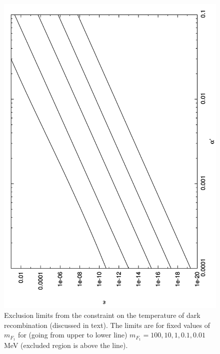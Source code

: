 \documentclass[12pt]{article}
\begin{document}
\vskip 0.8cm
\begin{figure}[htpb]
    \centering
        \includegraphics[scale=0.5, angle=270]{fig7}
    \caption{Exclusion limits from the constraint on the temperature of
dark recombination (discussed in text). The limits are for fixed values
of $m _{F_1}$ for (going from upper to lower line) $m _{F_1} = 100, 10,
1, 0.1, 0.01$ MeV (excluded region is above the line).}
    \label{fig:Exclusion dark recombination mf1}
\vskip 0.8cm
\end{figure}
\end{document}
